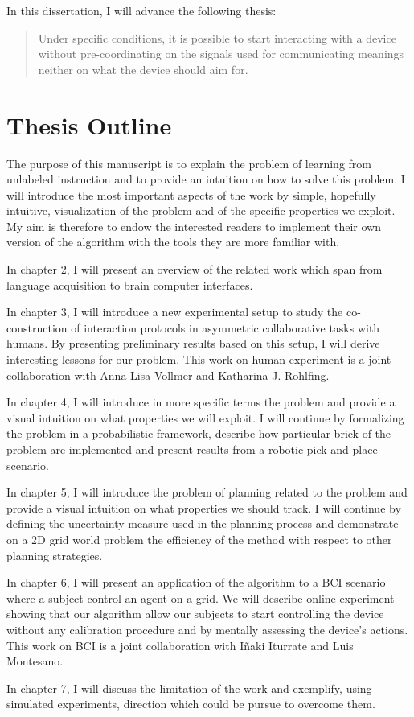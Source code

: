 In this dissertation, I will advance the following thesis:

\begin{quote}
Under specific conditions, it is possible to start interacting with a device without pre-coordinating on the signals used for communicating meanings neither on what the device should aim for.
\end{quote}

\section{Thesis Outline}

The purpose of this manuscript is to explain the problem of learning from unlabeled instruction and to provide an intuition on how to solve this problem. I will introduce the most important aspects of the work by simple, hopefully intuitive, visualization of the problem and of the specific properties we exploit. My aim is therefore to endow the interested readers to implement their own version of the algorithm with the tools they are more familiar with.

In chapter 2, I will present an overview of the related work which span from language acquisition to brain computer interfaces. 

In chapter 3, I will introduce a new experimental setup to study the co-construction of interaction protocols in asymmetric collaborative tasks with humans. By presenting preliminary results based on this setup, I will derive interesting lessons for our problem. This work on human experiment is a joint collaboration with Anna-Lisa Vollmer and Katharina J. Rohlfing. 

In chapter 4, I will introduce in more specific terms the problem and provide a visual intuition on what properties we will exploit. I will continue by formalizing the problem in a probabilistic framework, describe how particular brick of the problem are implemented and present results from a robotic pick and place scenario.

In chapter 5, I will introduce the problem of planning related to the problem and provide a visual intuition on what properties we should track. I will continue by defining the uncertainty measure used in the planning process and demonstrate on a 2D grid world problem the efficiency of the method with respect to other planning strategies.

In chapter 6, I will present an application of the algorithm to a BCI scenario where a subject control an agent on a grid. We will describe online experiment showing that our algorithm allow our subjects to start controlling the device without any calibration procedure and by mentally assessing the device's actions. This work on BCI is a joint collaboration with I{\~n}aki Iturrate and Luis Montesano.

In chapter 7, I will discuss the limitation of the work and exemplify, using simulated experiments, direction which could be pursue to overcome them.

